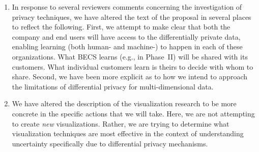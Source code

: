 \documentclass[11pt]{article}
\begin{document}
\begin{enumerate}
\item In response to several reviewers comments concerning the investigation
of privacy techniques, we have altered the text of the proposal in several
places to reflect the following. First, we attempt to make clear that
both the company and end users will have access to the differentially
private data, enabling learning (both human- and machine-) to happen
in each of these organizations. What BECS learns (e.g., in Phase~II)
will be shared with its customers. What individual customers learn is
theirs to decide with whom to share.  Second, we have been more explicit
as to how we intend to approach the limitations of differential privacy
for multi-dimensional data.

\item We have altered the description of the visualization research to
be more concrete in the specific actions that we will take.  Here, we are
not attempting to create \emph{new} visualizations.  Rather, we are trying
to determine what visualization techniques are most effective in the
context of understanding uncertainty specifically due to differential
privacy mechanisms.

\end{enumerate}
\end{document}
